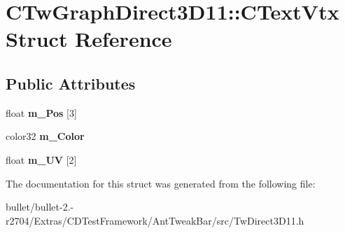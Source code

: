 \hypertarget{struct_c_tw_graph_direct3_d11_1_1_c_text_vtx}{\section{C\+Tw\+Graph\+Direct3\+D11\+:\+:C\+Text\+Vtx Struct Reference}
\label{struct_c_tw_graph_direct3_d11_1_1_c_text_vtx}
}
\subsection*{Public Attributes}
\begin{DoxyCompactItemize}
\item 
\hypertarget{struct_c_tw_graph_direct3_d11_1_1_c_text_vtx_ab29dbf82447a8751a15837ede2863d50}{float {\bfseries m\+\_\+\+Pos} \mbox{[}3\mbox{]}}\label{struct_c_tw_graph_direct3_d11_1_1_c_text_vtx_ab29dbf82447a8751a15837ede2863d50}

\item 
\hypertarget{struct_c_tw_graph_direct3_d11_1_1_c_text_vtx_ac502d175aecccaad4392e224fa133bc8}{color32 {\bfseries m\+\_\+\+Color}}\label{struct_c_tw_graph_direct3_d11_1_1_c_text_vtx_ac502d175aecccaad4392e224fa133bc8}

\item 
\hypertarget{struct_c_tw_graph_direct3_d11_1_1_c_text_vtx_a15f312bd876e092611a4d112257f6462}{float {\bfseries m\+\_\+\+U\+V} \mbox{[}2\mbox{]}}\label{struct_c_tw_graph_direct3_d11_1_1_c_text_vtx_a15f312bd876e092611a4d112257f6462}

\end{DoxyCompactItemize}


The documentation for this struct was generated from the following file\+:\begin{DoxyCompactItemize}
\item 
bullet/bullet-\/2.-\/r2704/\+Extras/\+C\+D\+Test\+Framework/\+Ant\+Tweak\+Bar/src/Tw\+Direct3\+D11.\+h\end{DoxyCompactItemize}
